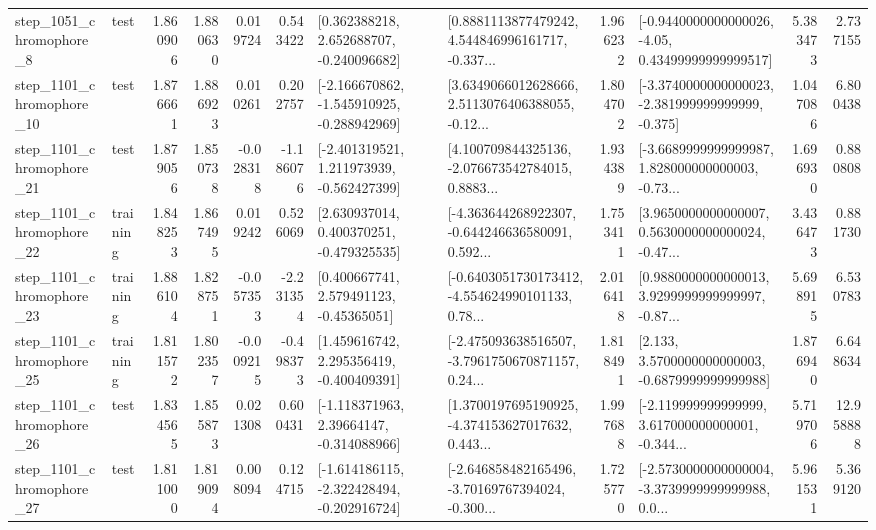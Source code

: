 \begin{tabular}{llrrrrllrlrr}
  step\_1051\_chromophore\_8 &      test &      1.860906 &    1.880630 &      0.019724 &  0.543422 &    [0.362388218, 2.652688707, -0.240096682] &  [0.8881113877479242, 4.544846996161717, -0.337... &       1.966232 &  [-0.9440000000000026, -4.05, 0.43499999999999517] &            5.383473 &          2.737155 \\
 step\_1101\_chromophore\_10 &      test &      1.876661 &    1.886923 &      0.010261 &  0.202757 &  [-2.166670862, -1.545910925, -0.288942969] &  [3.6349066012628666, 2.5113076406388055, -0.12... &       1.804702 &  [-3.3740000000000023, -2.381999999999999, -0.375] &            1.047086 &          6.800438 \\
 step\_1101\_chromophore\_21 &      test &      1.879056 &    1.850738 &     -0.028318 & -1.186076 &   [-2.401319521, 1.211973939, -0.562427399] &  [4.100709844325136, -2.076673542784015, 0.8883... &       1.934389 &  [-3.6689999999999987, 1.828000000000003, -0.73... &            1.696930 &          0.880808 \\
 step\_1101\_chromophore\_22 &  training &      1.848253 &    1.867495 &      0.019242 &  0.526069 &    [2.630937014, 0.400370251, -0.479325535] &  [-4.363644268922307, -0.644246636580091, 0.592... &       1.753411 &  [3.9650000000000007, 0.5630000000000024, -0.47... &            3.436473 &          0.881730 \\
 step\_1101\_chromophore\_23 &  training &      1.886104 &    1.828751 &     -0.057353 & -2.231354 &     [0.400667741, 2.579491123, -0.45365051] &  [-0.6403051730173412, -4.554624990101133, 0.78... &       2.016418 &  [0.9880000000000013, 3.9299999999999997, -0.87... &            5.698915 &          6.530783 \\
 step\_1101\_chromophore\_25 &  training &      1.811572 &    1.802357 &     -0.009215 & -0.498373 &    [1.459616742, 2.295356419, -0.400409391] &  [-2.475093638516507, -3.7961750670871157, 0.24... &       1.818491 &   [2.133, 3.5700000000000003, -0.6879999999999988] &            1.876940 &          6.648634 \\
 step\_1101\_chromophore\_26 &      test &      1.834565 &    1.855873 &      0.021308 &  0.600431 &    [-1.118371963, 2.39664147, -0.314088966] &  [1.3700197695190925, -4.374153627017632, 0.443... &       1.997688 &  [-2.119999999999999, 3.617000000000001, -0.344... &            5.719706 &         12.958888 \\
 step\_1101\_chromophore\_27 &      test &      1.811000 &    1.819094 &      0.008094 &  0.124715 &  [-1.614186115, -2.322428494, -0.202916724] &  [-2.646858482165496, -3.70169767394024, -0.300... &       1.725770 &  [-2.5730000000000004, -3.3739999999999988, 0.0... &            5.961531 &          5.369120 \\

\end{tabular}
